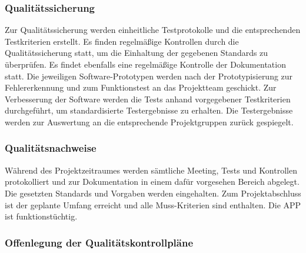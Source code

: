 \subsubsection{Qualitätssicherung}
Zur Qualitätssicherung werden einheitliche Testprotokolle und die entsprechenden Testkriterien erstellt. Es finden regelmäßige Kontrollen durch die Qualitätssicherung statt, um die Einhaltung der gegebenen Standards zu überprüfen. Es findet ebenfalls eine regelmäßige Kontrolle der Dokumentation statt. Die jeweiligen Software-Prototypen werden nach der Prototypisierung zur Fehlererkennung und zum Funktionstest an das Projektteam geschickt. Zur Verbesserung der Software werden die Tests anhand vorgegebener Testkriterien durchgeführt, um standardisierte Testergebnisse zu erhalten. Die Testergebnisse werden zur Auswertung an die entsprechende Projektgruppen zurück gespiegelt.


\subsubsection{Qualitätsnachweise}
Während des Projektzeitraumes werden sämtliche Meeting, Tests und Kontrollen protokolliert und zur Dokumentation in einem dafür vorgesehen Bereich abgelegt. Die gesetzten Standards und Vorgaben werden eingehalten. Zum Projektabschluss ist der geplante Umfang erreicht und alle Muss-Kriterien sind enthalten. Die APP ist funktionstüchtig.



\subsubsection{Offenlegung der Qualitätskontrollpläne}


